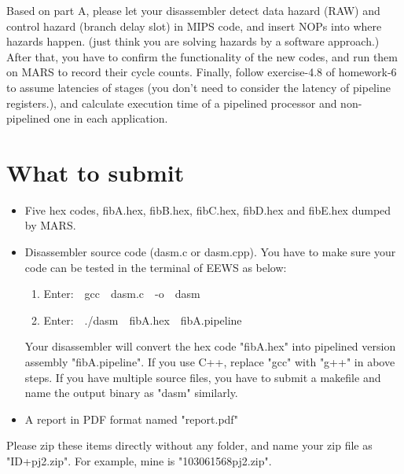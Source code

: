 \documentclass{article}
\begin{document}
Based on part A, please let your disassembler detect data hazard (RAW) and control hazard (branch delay slot) in MIPS code, and insert NOPs into where hazards happen. (just think you are solving hazards by a software approach.)
After that, you have to confirm the functionality of the new codes, and run them on MARS to record their cycle counts.
Finally, follow exercise-4.8 of homework-6 to assume latencies of stages (you don't need to consider the latency of pipeline registers.), and calculate execution time of a pipelined processor and non-pipelined one in each application.


\section{What to submit}
    
\begin{itemize}
    \item Five hex codes, fibA.hex, fibB.hex, fibC.hex, fibD.hex and fibE.hex dumped by MARS.
    \item Disassembler source code (dasm.c or dasm.cpp). You have to make sure your code can be tested in the terminal of EEWS as below:
    \begin{enumerate}
	\item Enter:\ \ gcc\ \ dasm.c\ \ -o\ \ dasm
	\item Enter:\ \ ./dasm\ \ fibA.hex\ \ fibA.pipeline
    \end{enumerate}
	Your disassembler will convert the hex code "fibA.hex" into pipelined version assembly "fibA.pipeline". 
	If you use C++, replace "gcc" with "g++" in above steps. 
	If you have multiple source files, you have to submit a makefile\cite{make} and name the output binary as "dasm" similarly.
    \item A report in PDF format named "report.pdf"
\end{itemize}
Please zip these items directly without any folder, and name your zip file as "ID+pj2.zip".
For example, mine is "103061568pj2.zip".




%
\end{document}
